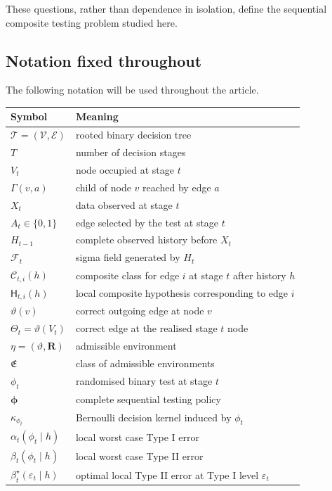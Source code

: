 \documentclass[11pt]{article}
\newcommand{\cC}{\mathcal{C}}
\newcommand{\cF}{\mathcal{F}}
\newcommand{\cV}{\mathcal{V}}
\newcommand{\cE}{\mathcal{E}}
\begin{document}
These questions, rather than dependence in isolation, define the sequential composite testing problem studied here.

\subsection{Notation fixed throughout}

The following notation will be used throughout the article.

\begin{center}
\begin{tabular}{@{}ll@{}}
\toprule
Symbol & Meaning \\
\midrule
$\mathcal{T}=(\cV,\cE)$ & rooted binary decision tree \\
$T$ & number of decision stages \\
$V_t$ & node occupied at stage $t$ \\
$\Gamma(v,a)$ & child of node $v$ reached by edge $a$ \\
$X_t$ & data observed at stage $t$ \\
$A_t\in\{0,1\}$ & edge selected by the test at stage $t$ \\
$H_{t-1}$ & complete observed history before $X_t$ \\
$\cF_t$ & sigma field generated by $H_t$ \\
$\cC_{t,i}(h)$ & composite class for edge $i$ at stage $t$ after history $h$ \\
$\mathsf{H}_{t,i}(h)$ & local composite hypothesis corresponding to edge $i$ \\
$\vartheta(v)$ & correct outgoing edge at node $v$ \\
$\Theta_t=\vartheta(V_t)$ & correct edge at the realised stage $t$ node \\
$\eta=(\vartheta,\mathbf{R})$ & admissible environment \\
$\mathfrak{E}$ & class of admissible environments \\
$\phi_t$ & randomised binary test at stage $t$ \\
$\boldsymbol{\phi}$ & complete sequential testing policy \\
$\kappa_{\phi_t}$ & Bernoulli decision kernel induced by $\phi_t$ \\
$\alpha_t(\phi_t\mid h)$ & local worst case Type I error \\
$\beta_t(\phi_t\mid h)$ & local worst case Type II error \\
$\beta_t^{\star}(\varepsilon_t\mid h)$ & optimal local Type II error at Type I level $\varepsilon_t$ \\

\end{tabular}
\end{center}
\end{document}
